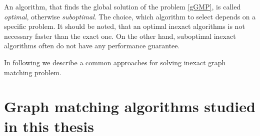 An algorithm, that finds the global solution of the problem \eqref{gGMP}, is called \emph{optimal}, otherwise \emph{suboptimal}. The choice, which algorithm to select depends on a specific problem. It should be noted, that an optimal inexact algorithms is not necessary faster than the exact one. On the other hand, suboptimal inexact algorithms often do not have any performance guarantee.

In following we describe a common approaches for solving inexact graph matching problem.






\section{Graph matching algorithms studied in this thesis}